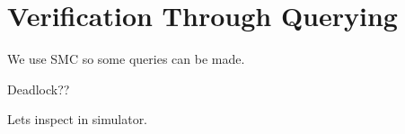 \chapter{Verification Through Querying}
We use SMC so some queries can be made.

Deadlock??

Lets inspect in simulator.
